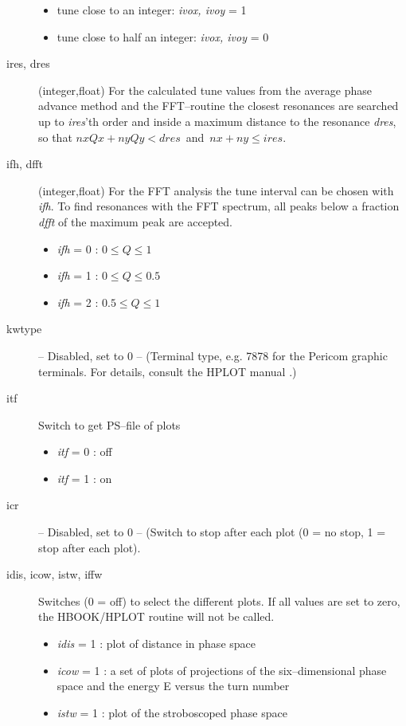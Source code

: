 \documentclass[a4paper,11pt]{report}
\begin{document}
\begin{description}
 \begin{itemize}
 \item tune close to an integer: {\em ivox, ivoy} \/= 1
 \item tune close to half an integer: {\em ivox, ivoy} \/= 0
 \end {itemize}
\item [ires, dres] (integer,float) For the calculated tune values from
  the average phase advance method and the FFT--routine the closest
  resonances are searched up to {\em ires}\/'th order and inside a
  maximum distance to the resonance {\em dres}\/, so that \mbox{$ nx
    Qx + ny Qy < dres $ and $ nx + ny \le ires $.}
\item [ifh, dfft] (integer,float) For the FFT analysis the tune
  interval can be chosen with {\em ifh}\/.  To find resonances with
  the FFT spectrum, all peaks below a fraction {\em dfft} \/of the
  maximum peak are accepted.
 \begin{itemize}
 \item {\em ifh} \/= 0 : $ 0 \le Q \le 1 $
 \item {\em ifh} \/= 1 : $ 0 \le Q \le 0.5 $
 \item {\em ifh} \/= 2 : $ 0.5 \le Q \le 1 $
 \end{itemize}
\item [kwtype] {\large -- Disabled, set to 0 --} ({\small Terminal
    type, e.g. 7878 for the Pericom graphic terminals. For details,
    consult the HPLOT manual \cite{HPLOT}.})
\item [itf] Switch to get PS--file of plots
  \begin{itemize}
  \item {\em itf} = 0 : off
  \item {\em itf} = 1 : on
  \end{itemize}
\item [icr] {\large -- Disabled, set to 0 --} ({\small Switch to stop
    after each plot (0 = no stop, 1 = stop after each plot).}
\item [idis, icow, istw, iffw] Switches (0 = off) to select the
  different plots. If all values are set to zero, the HBOOK/HPLOT
  routine will not be called.
  \begin{itemize}
  \item {\em idis} \/= 1 : plot of distance in phase space
  \item {\em icow} \/= 1 : a set of plots of projections of the
    six--dimensional phase space and the energy E versus the turn
    number
  \item {\em istw} \/= 1 : plot of the stroboscoped phase space

\end{itemize}
\end{description}
\end{document}
